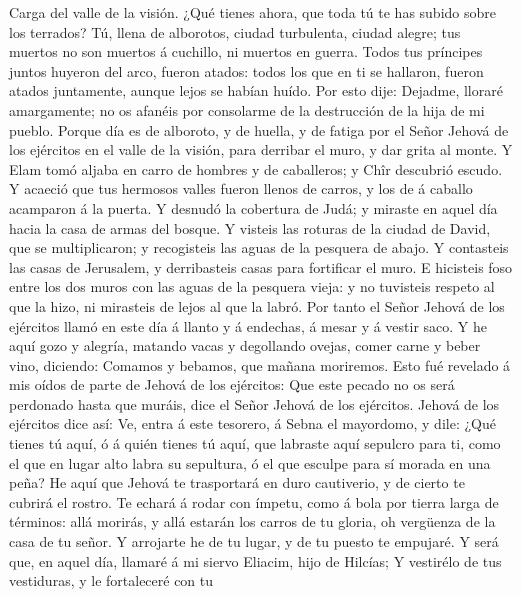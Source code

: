  Carga del valle de la visión. ¿Qué tienes ahora, que toda
tú te has subido sobre los terrados?  Tú, llena de
alborotos, ciudad turbulenta, ciudad alegre; tus muertos no son muertos
á cuchillo, ni muertos en guerra.  Todos tus príncipes
juntos huyeron del arco, fueron atados: todos los que en ti se hallaron,
fueron atados juntamente, aunque lejos se habían huído.  Por
esto dije: Dejadme, lloraré amargamente; no os afanéis por consolarme de
la destrucción de la hija de mi pueblo.  Porque día es de
alboroto, y de huella, y de fatiga por el Señor Jehová de los ejércitos
en el valle de la visión, para derribar el muro, y dar grita al monte.
 Y Elam tomó aljaba en carro de hombres y de caballeros; y
Chîr descubrió escudo.  Y acaeció que tus hermosos valles
fueron llenos de carros, y los de á caballo acamparon á la puerta.
 Y desnudó la cobertura de Judá; y miraste en aquel día
hacia la casa de armas del bosque.  Y visteis las roturas de
la ciudad de David, que se multiplicaron; y recogisteis las aguas de la
pesquera de abajo.  Y contasteis las casas de Jerusalem, y
derribasteis casas para fortificar el muro.  E hicisteis
foso entre los dos muros con las aguas de la pesquera vieja: y no
tuvisteis respeto al que la hizo, ni mirasteis de lejos al que la labró.
 Por tanto el Señor Jehová de los ejércitos llamó en este
día á llanto y á endechas, á mesar y á vestir saco.  Y he
aquí gozo y alegría, matando vacas y degollando ovejas, comer carne y
beber vino, diciendo: Comamos y bebamos, que mañana moriremos.
 Esto fué revelado á mis oídos de parte de Jehová de los
ejércitos: Que este pecado no os será perdonado hasta que muráis, dice
el Señor Jehová de los ejércitos.  Jehová de los ejércitos
dice así: Ve, entra á este tesorero, á Sebna el mayordomo, y dile:
 ¿Qué tienes tú aquí, ó á quién tienes tú aquí, que
labraste aquí sepulcro para ti, como el que en lugar alto labra su
sepultura, ó el que esculpe para sí morada en una peña?  He
aquí que Jehová te trasportará en duro cautiverio, y de cierto te
cubrirá el rostro.  Te echará á rodar con ímpetu, como á
bola por tierra larga de términos: allá morirás, y allá estarán los
carros de tu gloria, oh vergüenza de la casa de tu señor. 
Y arrojarte he de tu lugar, y de tu puesto te empujaré.  Y
será que, en aquel día, llamaré á mi siervo Eliacim, hijo de Hilcías;
 Y vestirélo de tus vestiduras, y le fortaleceré con tu
